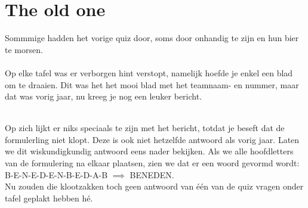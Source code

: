 \documentclass{exam}
\begin{document}
\section*{The old one}
Sommmige hadden het vorige quiz door, soms door onhandig te zijn en hun bier te morsen.\\ \\Op elke tafel was er verborgen hint verstopt, namelijk hoefde je enkel een blad om te draaien. Dit was het het mooi blad met het teamnaam- en nummer, maar dat was vorig jaar, nu kreeg je nog een leuker bericht.\\ \\
\centering {}


\vspace{0,5cm}
Op zich lijkt er niks speciaals te zijn met het bericht, totdat je beseft dat de formulerling niet klopt. Deze is ook niet hetzelfde antwoord als vorig jaar. Laten we dit wiskundigkundig antwoord eens nader bekijken. Als we alle hoofdletters van de formulering na elkaar plaatsen, zien we dat er een woord gevormd wordt: B-E-N-E-D-E-N-B-E-D-A-B $\implies$ BENEDEN.\\ Nu zouden die klootzakken toch geen antwoord van één van de quiz vragen onder tafel geplakt hebben hé.
\end{document}
